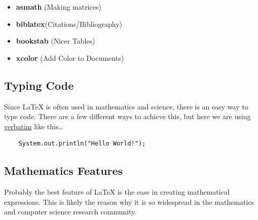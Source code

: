 \begin{itemize}
    \item \textbf{asmath} (Making matrices)
    \item \textbf{biblatex}(Citations/Bibliography)
    \item \textbf{bookstab} (Nicer Tables)
    \item \textbf{xcolor} (Add Color to Documents)
\end{itemize}

\subsection{Typing Code}

Since LaTeX is often used in mathematics and science, there is an easy way to type code. There are a few different ways to achieve this, but here we are using \underline{verbatim} like this\ldots

\begin{verbatim}
    System.out.println("Hello World!");
\end{verbatim}

\subsection{Mathematics Features}

Probably the best feature of LaTeX is the ease in creating mathematical expressions. This is likely the reason why it is so widespread in the mathematics and computer science research community.
